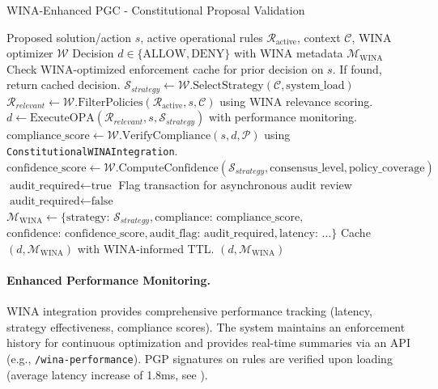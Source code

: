 \documentclass[manuscript,screen,9pt]{acmart}
\begin{document}
\begin{algorithm}[!htbp]
	\caption{WINA-Enhanced PGC - Constitutional Proposal Validation}
	\label{alg:wina_pgc_validation}
	\begin{algorithmic}[1]
		\Require Proposed solution/action $s$, active operational rules $\mathcal{R}_{\text{active}}$, context $\mathcal{C}$, WINA optimizer $\mathcal{W}$
		\Ensure Decision $d \in \{\text{ALLOW}, \text{DENY}\}$ with WINA metadata $\mathcal{M}_{\text{WINA}}$
		\State Check WINA-optimized enforcement cache for prior decision on $s$. If found, return cached decision.
		\State $\mathcal{S}_{strategy} \gets \mathcal{W}.\text{SelectStrategy}(\mathcal{C}, \text{system\_load})$
		\State $\mathcal{R}_{relevant} \gets \mathcal{W}.\text{FilterPolicies}(\mathcal{R}_{\text{active}}, s, \mathcal{C})$ using WINA relevance scoring.
		\State $d \gets \text{ExecuteOPA}(\mathcal{R}_{relevant}, s, \mathcal{S}_{strategy})$ with performance monitoring.
		\State $\text{compliance\_score} \gets \mathcal{W}.\text{VerifyCompliance}(s, d, \mathcal{P})$ using \texttt{ConstitutionalWINAIntegration}.
		\State $\text{confidence\_score} \gets \mathcal{W}.\text{ComputeConfidence}(\mathcal{S}_{strategy}, \text{consensus\_level}, \text{policy\_coverage})$
		\State $\text{audit\_required} \gets \text{true}$
		\State Flag transaction for asynchronous audit review
		\Else
		\State $\text{audit\_required} \gets \text{false}$
		\EndIf
		\State $\mathcal{M}_{\text{WINA}} \gets \{\text{strategy: } \mathcal{S}_{strategy}, \text{compliance: } \text{compliance\_score},$
		\State \hspace{2em} $\text{confidence: } \text{confidence\_score}, \text{audit\_flag: } \text{audit\_required}, \text{latency: } \dots \}$
		\State Cache $(d, \mathcal{M}_{\text{WINA}})$ with WINA-informed TTL.
		\State \Return $(d, \mathcal{M}_{\text{WINA}})$
		\EndFunction
	\end{algorithmic}
\end{algorithm}

\paragraph{Enhanced Performance Monitoring.} WINA integration provides comprehensive performance tracking (latency, strategy effectiveness, compliance scores). The system maintains an enforcement history for continuous optimization and provides real-time summaries via an API (e.g., \texttt{/wina-performance}). PGP signatures on rules are verified upon loading (average latency increase of 1.8ms, see ).
\end{document}
